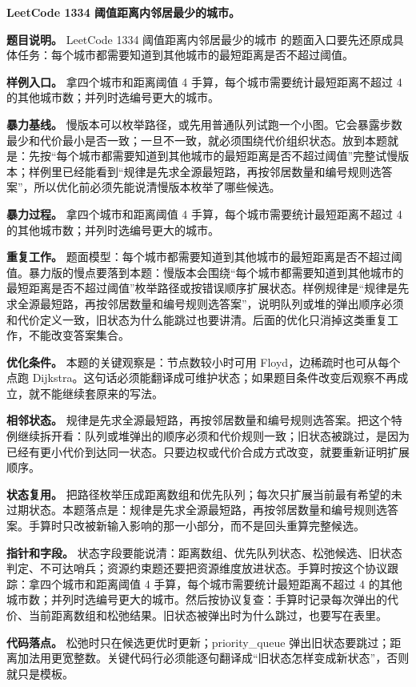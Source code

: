 \noindent\textbf{LeetCode 1334 阈值距离内邻居最少的城市。}

\textbf{题目说明。} LeetCode 1334 阈值距离内邻居最少的城市 的题面入口要先还原成具体任务：每个城市都需要知道到其他城市的最短距离是否不超过阈值。

\textbf{样例入口。} 拿四个城市和距离阈值 4 手算，每个城市需要统计最短距离不超过 4 的其他城市数；并列时选编号更大的城市。

\textbf{暴力基线。} 慢版本可以枚举路径，或先用普通队列试跑一个小图。它会暴露步数最少和代价最小是否一致；一旦不一致，就必须围绕代价组织状态。放到本题就是：先按“每个城市都需要知道到其他城市的最短距离是否不超过阈值”完整试慢版本；样例里已经能看到“规律是先求全源最短路，再按邻居数量和编号规则选答案”，所以优化前必须先能说清慢版本枚举了哪些候选。

\textbf{暴力过程。} 拿四个城市和距离阈值 4 手算，每个城市需要统计最短距离不超过 4 的其他城市数；并列时选编号更大的城市。

\textbf{重复工作。} 题面模型：每个城市都需要知道到其他城市的最短距离是否不超过阈值。暴力版的慢点要落到本题：慢版本会围绕“每个城市都需要知道到其他城市的最短距离是否不超过阈值”枚举路径或按错误顺序扩展状态。样例规律是“规律是先求全源最短路，再按邻居数量和编号规则选答案”，说明队列或堆的弹出顺序必须和代价定义一致，旧状态为什么能跳过也要讲清。后面的优化只消掉这类重复工作，不能改变答案集合。

\textbf{优化条件。} 本题的关键观察是：节点数较小时可用 Floyd，边稀疏时也可从每个点跑 Dijkstra。这句话必须能翻译成可维护状态；如果题目条件改变后观察不再成立，就不能继续套原来的写法。

\textbf{相邻状态。} 规律是先求全源最短路，再按邻居数量和编号规则选答案。把这个特例继续拆开看：队列或堆弹出的顺序必须和代价规则一致；旧状态被跳过，是因为已经有更小代价到达同一状态。只要边权或代价合成方式改变，就要重新证明扩展顺序。

\textbf{状态复用。} 把路径枚举压成距离数组和优先队列；每次只扩展当前最有希望的未过期状态。本题落点是：规律是先求全源最短路，再按邻居数量和编号规则选答案。手算时只改被新输入影响的那一小部分，而不是回头重算完整候选。

\textbf{指针和字段。} 状态字段要能说清：距离数组、优先队列状态、松弛候选、旧状态判定、不可达哨兵；资源约束题还要把资源维度放进状态。手算时按这个协议跟踪：拿四个城市和距离阈值 4 手算，每个城市需要统计最短距离不超过 4 的其他城市数；并列时选编号更大的城市。然后按协议复查：手算时记录每次弹出的代价、当前距离数组和松弛结果。旧状态被弹出时为什么跳过，也要写在表里。

\textbf{代码落点。} 松弛时只在候选更优时更新；priority\_queue 弹出旧状态要跳过；距离加法用更宽整数。关键代码行必须能逐句翻译成“旧状态怎样变成新状态”，否则就只是模板。

